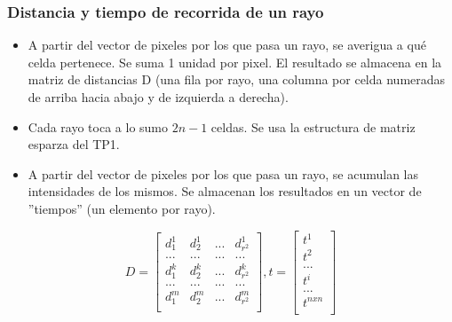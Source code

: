 \documentclass[11pt]{beamer}
\begin{document}
\begin{frame}
\frametitle{Distancia y tiempo de recorrida de un rayo}
\begin{itemize}
\item A partir del vector de pixeles por los que pasa un rayo, se averigua a qué celda pertenece. Se suma 1 unidad por pixel. El resultado se almacena en la matriz de distancias D (una fila por rayo, una columna por celda numeradas de arriba hacia abajo y de izquierda a derecha).
\item Cada rayo toca a lo sumo $2n-1$ celdas. Se usa la estructura de matriz esparza del TP1.
\item A partir del vector de pixeles por los que pasa un rayo, se acumulan las intensidades de los mismos. Se almacenan los resultados en un vector de ''tiempos'' (un elemento por rayo).
\end{itemize}
$$
D = \left[
\begin{array}{cccc}
d^1_1 & d^1_2 & ... & d^1_{r^2} \\
... & ... & ... & ... \\
d^k_1 & d^k_2 & ... & d^k_{r^2} \\
... & ... & ... & ... \\
d^m_1 & d^m_2 & ... & d^m_{r^2} \\
\end{array}
\right]
,
t=\left[
\begin{array}{c}
t^1 \\
t^2 \\
... \\
t^i \\
... \\
t^{nxn} \\
\end{array}
\right]
$$
\end{frame}


\end{document}
